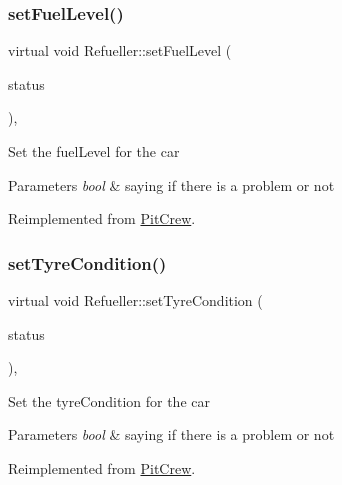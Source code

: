 \subsubsection{\texorpdfstring{set\+Fuel\+Level()}{setFuelLevel()}}
{\footnotesize\ttfamily virtual void Refueller\+::set\+Fuel\+Level (\begin{DoxyParamCaption}\item[{bool}]{status }\end{DoxyParamCaption})\hspace{0.3cm}{\ttfamily [inline]}, {\ttfamily [virtual]}}

Set the fuel\+Level for the car 
\begin{DoxyParams}{Parameters}
{\em bool} & saying if there is a problem or not \\
\hline
\end{DoxyParams}


Reimplemented from \mbox{\hyperlink{class_pit_crew_a8c137bb619ab3a331f4f1d7023477e4b}{Pit\+Crew}}.

\mbox{\label{class_refueller_a7260c4594e1def9110d293186a9dc14c}} 
\subsubsection{\texorpdfstring{set\+Tyre\+Condition()}{setTyreCondition()}}
{\footnotesize\ttfamily virtual void Refueller\+::set\+Tyre\+Condition (\begin{DoxyParamCaption}\item[{bool $\ast$}]{status }\end{DoxyParamCaption})\hspace{0.3cm}{\ttfamily [inline]}, {\ttfamily [virtual]}}

Set the tyre\+Condition for the car 
\begin{DoxyParams}{Parameters}
{\em bool} & saying if there is a problem or not \\
\hline
\end{DoxyParams}


Reimplemented from \mbox{\hyperlink{class_pit_crew_a281583ec0986aeec56fc70dd362fa31c}{Pit\+Crew}}.

\mbox{\label{class_refueller_a61a9f440ae2e7ca694b40b03a6a7b8d6}} 
